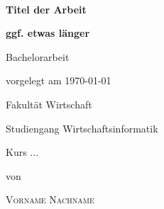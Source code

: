 \newcommand{\typMeinerArbeit}{Bachelorarbeit}

\newcommand{\themaMeinerArbeit}{Mein Titel}

\newcommand{\meinName}{Vorname Nachname}

\thispagestyle{empty}

\begin{spacing}{1}
	\begin{center}
		~\vspace{0mm}

		{\sffamily
			\LARGE
			\textbf{Titel der Arbeit}

			\bigskip
			\textbf{ggf. etwas länger}
		}


		\vspace{15mm}

		{\Large \typMeinerArbeit}

		\vspace{1cm}

		vorgelegt am \today

		\vspace{15mm}

		Fakultät Wirtschaft
		\medskip

		Studiengang Wirtschaftsinformatik
		\medskip

		Kurs ...

		\vspace{10mm}

		von

		\vspace{10mm}

		{\large\textsc{\meinName}}

		\vspace{10mm}
	\end{center}

	\vfill


\end{spacing}
